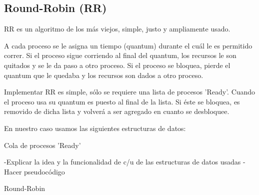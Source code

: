 \subsection{Round-Robin (RR)}
RR es un algoritmo de los más viejos, simple, justo y ampliamente usado.\newline

A cada proceso se le asigna un tiempo (quantum) durante el cuál le es permitido correr.
Si el proceso sigue corriendo al final del quantum, los recursos le son quitados y se le da paso a otro proceso.
Si el proceso se bloquea, pierde el quantum que le quedaba y los recursos son dados a otro proceso.\newline

Implementar RR es simple, sólo se requiere una lista de procesos 'Ready'.\newline
Cuando el proceso usa su quantum es puesto al final de la lista. \newline
Si éste se bloquea, es removido de dicha lista y volverá a ser agregado en cuanto se desbloquee.

En nuestro caso usamos las siguientes estructuras de datos:
 \begin{description}
  \item[Cola de procesos 'Ready']{}
 \end{description}
 
-Explicar la idea y la funcionalidad de c/u de las
estructuras de datos usadas
-Hacer pseudocódigo

\begin{algorithm}
 \caption{Round-Robin}
 \begin{algorithmic}[1] 
 \EndProcedure
\newline

 \EndProcedure
\newline

   \Else
	 \EndIf	    
      \EndIf
   \EndIf
 \EndProcedure
\newline
 
    \EndIf
 \EndProcedure
 \end{algorithmic}
\end{algorithm}

